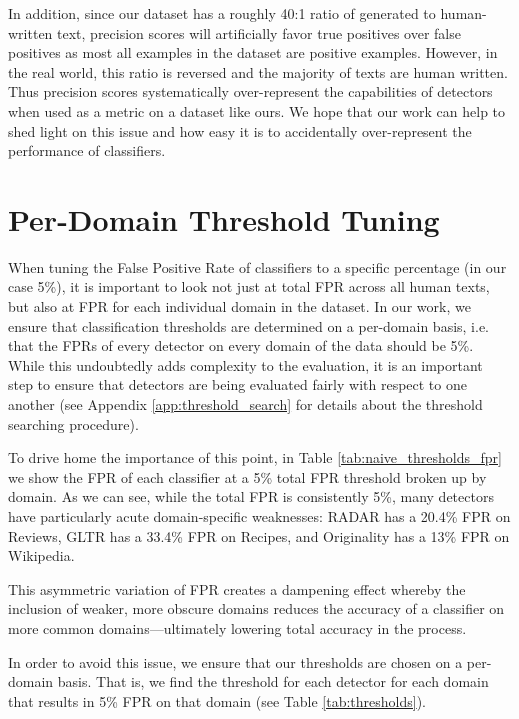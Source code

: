 \documentclass[11pt]{article}
\begin{document}
In addition, since our dataset has a roughly 40:1 ratio of generated to human-written text, precision scores will artificially favor true positives over false positives as most all examples in the dataset are positive examples. However, in the real world, this ratio is reversed and the majority of texts are human written. Thus precision scores systematically over-represent the capabilities of detectors when used as a metric on a dataset like ours. We hope that our work can help to shed light on this issue and how easy it is to accidentally over-represent the performance of classifiers.

\section{Per-Domain Threshold Tuning}
\label{app:threshold_tuning}
When tuning the False Positive Rate of classifiers to a specific percentage (in our case 5\%), it is important to look not just at total FPR across all human texts, but also at FPR for each individual domain in the dataset. In our work, we ensure that classification thresholds are determined on a per-domain basis, i.e. that the FPRs of every detector on every domain of the data should be 5\%. While this undoubtedly adds complexity to the evaluation, it is an important step to ensure that detectors are being evaluated fairly with respect to one another (see Appendix \ref{app:threshold_search} for details about the threshold searching procedure). 

To drive home the importance of this point, in Table \ref{tab:naive_thresholds_fpr} we show the FPR of each classifier at a 5\% total FPR threshold broken up by domain. As we can see, while the total FPR is consistently 5\%, many detectors have particularly acute domain-specific weaknesses: RADAR has a 20.4\% FPR on Reviews, GLTR has a 33.4\% FPR on Recipes, and Originality has a 13\% FPR on Wikipedia. 

This asymmetric variation of FPR creates a dampening effect whereby the inclusion of weaker, more obscure domains reduces the accuracy of a classifier on more common domains---ultimately lowering total accuracy in the process. 

In order to avoid this issue, we ensure that our thresholds are chosen on a per-domain basis. That is, we find the threshold for each detector for each domain that results in 5\% FPR on that domain (see Table \ref{tab:thresholds}).
\end{document}
